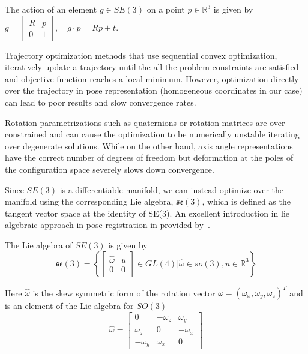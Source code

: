 \documentclass[0-suturing.tex]{subfiles}
\begin{document}
\noindent The action of an element $g \in SE(3)$ on a point $p \in \mathbb{R}^3$ is given by
$g = \begin{bmatrix}
R & p \\
0 & 1
\end{bmatrix},
\quad g \cdot p = Rp + t $.


Trajectory optimization methods that use sequential convex optimization, iteratively update a trajectory until the all the problem constraints are satisfied and objective function reaches a local minimum. However, optimization directly over the trajectory in pose representation (homogeneous coordinates in our case) can lead to poor results and slow convergence rates.

Rotation parametrizations such as quaternions or rotation matrices are over-constrained and can cause the optimization to be numerically unstable iterating over degenerate solutions.
While on the other hand, axis angle representations have the correct number of degrees of freedom but deformation at the poles of the configuration space severely slows down convergence.

Since $SE(3)$ is a differentiable manifold, we can instead optimize over the manifold using the corresponding Lie algebra, $\mathfrak{se}(3)$, which is defined as the tangent vector space at the identity of SE(3). An excellent introduction in lie algebraic approach in pose registration in provided by~\citet{Agrawal2006Lie}.

\noindent The Lie algebra of $SE(3)$ is given by
\begin{equation}
    \mathfrak{se}(3) = \left\{
    \begin{bmatrix}
        \hat{\omega} & u \\
        0 & 0
    \end{bmatrix}
    \in GL(4) \rvert \hat{\omega}\in so(3), u \in \mathbb{R}^3
    \right\}
\end{equation}

\noindent Here $\hat{\omega}$ is the skew symmetric form of the rotation vector
$\omega = (\omega_x, \omega_y, \omega_z)^T$ and is an element of the Lie algebra for $SO(3)$
\begin{equation}
    \hat{\omega} =
    \begin{bmatrix}
        0 & -\omega_z & \omega_y  \\
        \omega_z & 0 & -\omega_x \\
        -\omega_y & \omega_x & 0
    \end{bmatrix}
\end{equation}
\end{document}
